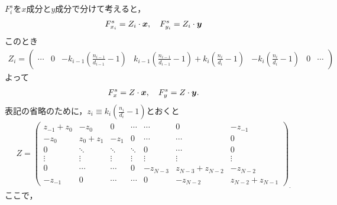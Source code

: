 $F_{i}^{s}$を$x$成分と$y$成分で分けて考えると，
\begin{eqnarray*}
  F_{x_{i}}^{s} = Z_{i} \cdot \mbox{\boldmath \(x\)}, \quad F_{y_{i}}^{s} = Z_{i} \cdot \mbox{\boldmath \(y\)}
\end{eqnarray*}
このとき
\begin{eqnarray*}
  Z_{i} = \left(
    \begin{array}{ccccccc}
      \cdots &  0 & -k_{i-1}\left(\frac{n_{i-1}}{d_{i-1}} - 1 \right) & k_{i-1}\left(\frac{n_{i-1}}{d_{i-1}} - 1\right) + k_{i}\left(\frac{n_{i}}{d_{i}}-1\right) & - k_{i}\left(\frac{n_{i}}{d_{i}}-1\right) & 0 & \cdots
    \end{array}
    \right)
\end{eqnarray*}
よって
\begin{eqnarray*}
  F_{x}^{s} = Z \cdot \mbox{\boldmath \(x\)}, \quad F_{y}^{s} = Z \cdot \mbox{\boldmath \(y\)}.
\end{eqnarray*}
表記の省略のために，$z_{i} \equiv k_{i}\left( \frac{n_{i}}{d_{i}} - 1\right)$とおくと
\begin{eqnarray*}
  Z = \left(
    \begin{array}{ccccccc}
      z_{-1} + z_{0} & -z_{0}        & 0      & \cdots & \cdots   & 0                 & -z_{-1}          \\
      -z_{0}         & z_{0} + z_{1} & -z_{1} & 0      & \cdots   & \cdots            & 0                \\
      0              & \ddots        & \ddots & \ddots & 0        & \cdots            & 0                \\
      \vdots         & \vdots        & \vdots & \vdots & \vdots   & \vdots            & \vdots           \\
      0              & \cdots        & \cdots & 0      & -z_{N-3} & z_{N-3} + z_{N-2} & -z_{N-2}         \\
      -z_{-1}        & 0             & \cdots & \cdots & 0        & -z_{N-2}          & z_{N-2} + z_{N-1}
    \end{array}
  \right)_{.}
\end{eqnarray*}
ここで，
